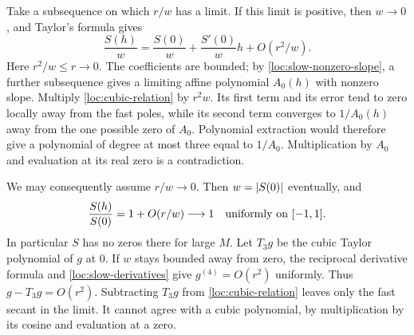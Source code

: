 Take a subsequence on which $r/w$ has a limit. If this limit is
positive, then $w\to0$, and Taylor's formula gives
\[
 \frac{S(h)}w=\frac{S(0)}w+\frac{S'(0)}w h+O(r^2/w).
\]
Here $r^2/w\le r\to0$. The coefficients are bounded; by
\cref{loc:slow-nonzero-slope}, a further subsequence gives a limiting
affine polynomial $A_0(h)$ with nonzero slope. Multiply
\cref{loc:cubic-relation} by $r^2w$. Its first term and its error
tend to zero locally away from the fast poles, while its second term
converges to $1/A_0(h)$ away from the one possible zero of $A_0$.
Polynomial extraction would therefore give a polynomial of degree
at most three equal to $1/A_0$. Multiplication by $A_0$ and evaluation
at its real zero is a contradiction.

We may consequently assume $r/w\to0$. Then $w=\left\lvert S(0)\right\rvert$
eventually, and
\begin{equation}
 \frac{S(h)}{S(0)}=1+O(r/w)\longrightarrow1
 \quad\hbox{uniformly on }[-1,1].
 \label{loc:almost-constant-denominator}
\end{equation}
In particular $S$ has no zeros there for large $M$.
Let $T_3g$ be the cubic Taylor polynomial of $g$ at $0$.
If $w$ stays bounded away from zero, the reciprocal derivative formula
and \cref{loc:slow-derivatives} give $g^{(4)}=O(r^2)$ uniformly.
Thus $g-T_3g=O(r^2)$. Subtracting $T_3g$ from
\cref{loc:cubic-relation} leaves only the fast secant in the limit.
It cannot agree with a cubic polynomial, by multiplication by its
cosine and evaluation at a zero.

